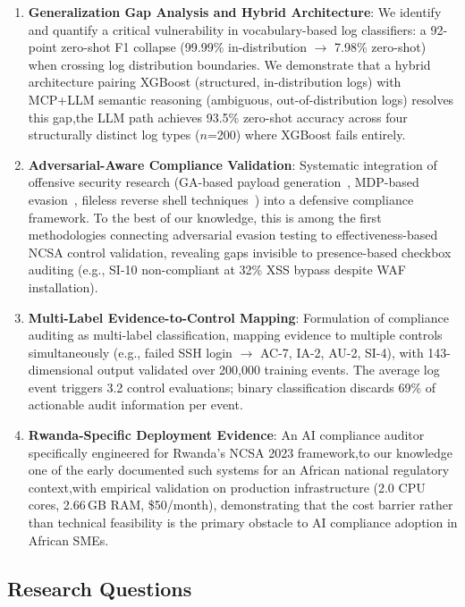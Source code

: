 \documentclass[futureinternet,article,submit,pdftex,moreauthors]{Definitions/mdpi}
\begin{document}
\begin{enumerate}
\item \textbf{Generalization Gap Analysis and Hybrid Architecture}: We identify and quantify
a critical vulnerability in vocabulary-based log classifiers: a 92-point zero-shot F1
collapse (99.99\% in-distribution $\rightarrow$ 7.98\% zero-shot) when crossing log
distribution boundaries. We demonstrate that a hybrid architecture pairing XGBoost
(structured, in-distribution logs) with MCP+LLM semantic reasoning (ambiguous,
out-of-distribution logs) resolves this gap,the LLM path achieves 93.5\% zero-shot
accuracy across four structurally distinct log types ($n$=200) where XGBoost fails entirely.

\item \textbf{Adversarial-Aware Compliance Validation}: Systematic integration of offensive
security research (GA-based payload generation~\cite{ga_xss_paper}, MDP-based
evasion~\cite{dp_payload_paper}, fileless reverse shell techniques~\cite{reverse_shell_paper})
into a defensive compliance framework. To the best of our knowledge, this is among the first
methodologies connecting adversarial evasion testing to effectiveness-based NCSA control
validation, revealing gaps invisible to presence-based checkbox auditing
(e.g., SI-10 non-compliant at 32\% XSS bypass despite WAF installation).

\item \textbf{Multi-Label Evidence-to-Control Mapping}: Formulation of compliance auditing as
multi-label classification, mapping evidence to multiple controls simultaneously
(e.g., failed SSH login $\rightarrow$ AC-7, IA-2, AU-2, SI-4), with 143-dimensional output
validated over 200{,}000 training events. The average log event triggers 3.2 control
evaluations; binary classification discards 69\% of actionable audit information per event.

\item \textbf{Rwanda-Specific Deployment Evidence}: An AI compliance auditor specifically
engineered for Rwanda's NCSA 2023 framework,to our knowledge one of the early documented
such systems for an African national regulatory context,with empirical validation on
production infrastructure (2.0 CPU cores, 2.66\,GB RAM, \$50/month), demonstrating that
the cost barrier rather than technical feasibility is the primary obstacle to AI compliance
adoption in African SMEs.
\end{enumerate}

\subsection{Research Questions}
\end{document}
